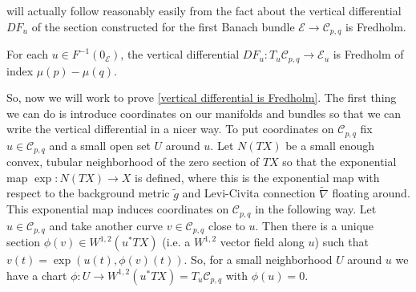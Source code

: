  will actually follow reasonably easily from the fact about the vertical differential $DF_u$ of the section constructed for the first Banach bundle $\mathcal E \rightarrow \mathcal C_{p,q}$ is Fredholm.
\begin{prop}
\label{vertical differential is Fredholm}
For each $u \in F^{-1}(0_{\mathcal E})$, the vertical differential $DF_u : T_u \mathcal C_{p,q} \rightarrow \mathcal E_u$ is Fredholm of index $\mu(p)-\mu(q)$.
\end{prop}

So, now we will work to prove \cref{vertical differential is Fredholm}. The first thing we can do is introduce coordinates on our manifolds and bundles so that we can write the vertical differential in a nicer way. To put coordinates on $\mathcal C_{p,q}$ fix $u \in \mathcal C_{p,q}$ and a small open set $U$ around $u$. Let $N(TX)$ be a small enough convex, tubular neighborhood of the zero section of $TX$ so that the exponential map $\exp : N(TX) \rightarrow X$ is defined, where this is the exponential map with respect to the background metric $\widetilde g$ and Levi-Civita connection $\widetilde\nabla$ floating around. This exponential map induces coordinates on $\mathcal C_{p,q}$ in the following way. Let $u \in \mathcal C_{p,q}$ and take another curve $v \in \mathcal C_{p,q}$ close to $u$. Then there is a unique section $\phi(v) \in W^{1,2}(u^* TX)$ (i.e. a $W^{1,2}$ vector field along $u$) such that $v(t) = \exp(u(t),\phi(v)(t))$. So, for a small neighborhood $U$ around $u$ we have a chart $\phi : U \rightarrow W^{1,2}(u^* TX) = T_u \mathcal C_{p,q}$ with $\phi(u)=0$.

